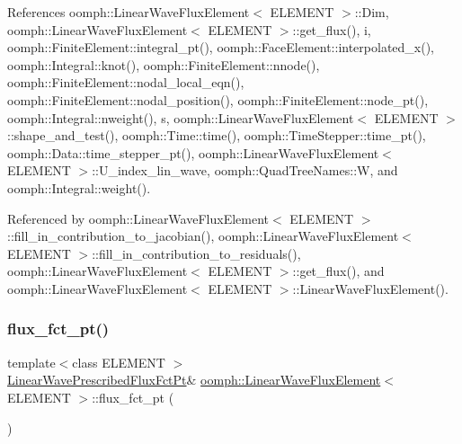References oomph\+::\+Linear\+Wave\+Flux\+Element$<$ E\+L\+E\+M\+E\+N\+T $>$\+::\+Dim, oomph\+::\+Linear\+Wave\+Flux\+Element$<$ E\+L\+E\+M\+E\+N\+T $>$\+::get\+\_\+flux(), i, oomph\+::\+Finite\+Element\+::integral\+\_\+pt(), oomph\+::\+Face\+Element\+::interpolated\+\_\+x(), oomph\+::\+Integral\+::knot(), oomph\+::\+Finite\+Element\+::nnode(), oomph\+::\+Finite\+Element\+::nodal\+\_\+local\+\_\+eqn(), oomph\+::\+Finite\+Element\+::nodal\+\_\+position(), oomph\+::\+Finite\+Element\+::node\+\_\+pt(), oomph\+::\+Integral\+::nweight(), s, oomph\+::\+Linear\+Wave\+Flux\+Element$<$ E\+L\+E\+M\+E\+N\+T $>$\+::shape\+\_\+and\+\_\+test(), oomph\+::\+Time\+::time(), oomph\+::\+Time\+Stepper\+::time\+\_\+pt(), oomph\+::\+Data\+::time\+\_\+stepper\+\_\+pt(), oomph\+::\+Linear\+Wave\+Flux\+Element$<$ E\+L\+E\+M\+E\+N\+T $>$\+::\+U\+\_\+index\+\_\+lin\+\_\+wave, oomph\+::\+Quad\+Tree\+Names\+::W, and oomph\+::\+Integral\+::weight().



Referenced by oomph\+::\+Linear\+Wave\+Flux\+Element$<$ E\+L\+E\+M\+E\+N\+T $>$\+::fill\+\_\+in\+\_\+contribution\+\_\+to\+\_\+jacobian(), oomph\+::\+Linear\+Wave\+Flux\+Element$<$ E\+L\+E\+M\+E\+N\+T $>$\+::fill\+\_\+in\+\_\+contribution\+\_\+to\+\_\+residuals(), oomph\+::\+Linear\+Wave\+Flux\+Element$<$ E\+L\+E\+M\+E\+N\+T $>$\+::get\+\_\+flux(), and oomph\+::\+Linear\+Wave\+Flux\+Element$<$ E\+L\+E\+M\+E\+N\+T $>$\+::\+Linear\+Wave\+Flux\+Element().

\mbox{\label{classoomph_1_1LinearWaveFluxElement_a00946fd9acf1e2d85a6a3f31e3d7500e}} 
\subsubsection{\texorpdfstring{flux\+\_\+fct\+\_\+pt()}{flux\_fct\_pt()}}
{\footnotesize\ttfamily template$<$class E\+L\+E\+M\+E\+NT $>$ \\
\hyperlink{classoomph_1_1LinearWaveFluxElement_a4010abac8856733ae2b152bc41e7b558}{Linear\+Wave\+Prescribed\+Flux\+Fct\+Pt}\& \hyperlink{classoomph_1_1LinearWaveFluxElement}{oomph\+::\+Linear\+Wave\+Flux\+Element}$<$ E\+L\+E\+M\+E\+NT $>$\+::flux\+\_\+fct\+\_\+pt (\begin{DoxyParamCaption}{ }\end{DoxyParamCaption})\hspace{0.3cm}{\ttfamily [inline]}}



